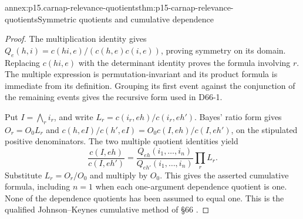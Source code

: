 \begin{annexitem}{annex:p15.carnap-relevance-quotients}{thm:p15-carnap-relevance-quotients}{Symmetric quotients and cumulative dependence}
\begin{proof}
The multiplication identity gives
\(Q_e(h,i)=c(hi,e)/(c(h,e)c(i,e))\), proving symmetry on its
domain. Replacing \(c(hi,e)\) with the determinant identity
proves the formula involving \(r\). The multiple expression is
permutation-invariant and its product formula is immediate from its
definition. Grouping its first event against the conjunction of the
remaining events gives the recursive form used in D66-1.

Put \(I=\bigwedge_r i_r\), and write
\(L_r=c(i_r,eh)/c(i_r,eh')\). Bayes' ratio form gives
\(O_r=O_0L_r\) and
\(c(h,eI)/c(h',eI)=O_0c(I,eh)/c(I,eh')\), on the stipulated
positive denominators. The two multiple quotient identities yield
\[
 \frac{c(I,eh)}{c(I,eh')}=
 \frac{Q_{eh}(i_1,\ldots,i_n)}{Q_{eh'}(i_1,\ldots,i_n)}
 \prod_r L_r.
\]
Substitute \(L_r=O_r/O_0\) and multiply by \(O_0\).
This gives the asserted cumulative formula, including \(n=1\)
when each one-argument dependence quotient is one. None of the
dependence quotients has been assumed to equal one. This is the
qualified Johnson--Keynes cumulative method of §66
\cite{Carnap1950Probability}.
\end{proof}
\end{annexitem}
